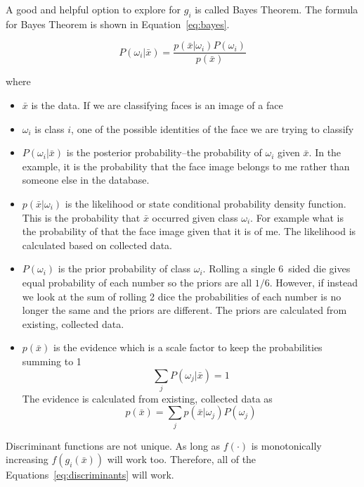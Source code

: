 A good and helpful option to explore for $g_i$ is called Bayes Theorem. The formula for Bayes Theorem
is shown in Equation~\ref{eq:bayes}. 

\begin{equation} \label{eq:bayes}
    P\left(\omega_i | \bar{x}\right) = \frac{p(\bar{x}|\omega_i)P(\omega_i)}{p(\bar{x})}
\end{equation}

where
\begin{itemize}
    \item $\bar{x}$ is the data. If we are classifying faces is an image of a face 
    \item $\omega_i$ is class $i$, one of the possible identities of the face we are trying to classify 
    \item $P(\omega_i|\bar{x})$ is the posterior probability--the probability of $\omega_i$ 
            given $\bar{x}$. In the example, it is the probability that the 
            face image belongs to me rather than someone else in the database.
    \item $p(\bar{x}|\omega_i)$ is the likelihood or state conditional probability density function. 
            This is the probability that $\bar{x}$ occurred given class $\omega_i$. For example what 
            is the probability of that the face image given that it is of me. The likelihood is 
            calculated based on collected data.
    \item $P(\omega_i)$ is the prior probability of class $\omega_i$. Rolling a single 6~sided die gives 
            equal probability of each number so the priors are all $1/6$. However, if instead we look at 
            the sum of rolling 2 dice the probabilities of each number is no longer the same and the 
            priors are different. The priors are calculated from existing, collected data.
    \item $p(\bar{x})$ is the evidence which is a scale factor to keep the probabilities summing to 1
    \begin{equation}
        \sum_j P(\omega_j|\bar{x}) = 1
    \end{equation}
            The evidence is calculated from existing, collected data as
    \begin{equation}
        p(\bar{x}) = \sum_j p(\bar{x}|\omega_j)P(\omega_j)
    \end{equation}
\end{itemize}

Discriminant functions are not unique. As long as $f(\cdot)$ is monotonically increasing 
$f(g_i(\bar{x}))$ will work too. Therefore, all of the Equations~\ref{eq:discriminants} will work.

